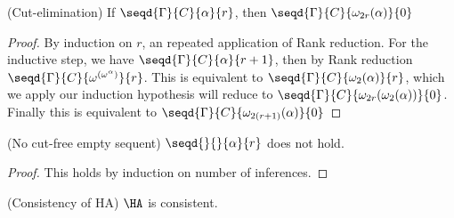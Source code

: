 \begin{cththeorem}{(Cut-elimination)}
    If $\seqd{\Gamma}{C}{\alpha}{r}$, then $\seqd{\Gamma}{C}{\omega_{2r}(\alpha)}{0}$
\end{cththeorem}
\begin{proof}
    By induction on $r$, an repeated application of Rank reduction. For the inductive step, we have $\seqd{\Gamma}{C}{\alpha}{r+1}$, then by Rank reduction $\seqd{\Gamma}{C}{\omega^{\left(\omega^\alpha\right)}}{r}$. This is equivalent to $\seqd{\Gamma}{C}{\omega_2(\alpha)}{r}$, which we apply our induction hypothesis will reduce to $\seqd{\Gamma}{C}{\omega_{2r}(\omega_2(\alpha))}{0}$. Finally this is equivalent to $\seqd{\Gamma}{C}{\omega_{2(r+1)}(\alpha)}{0}$
\end{proof}

\begin{cththeorem}{(No cut-free empty sequent)}
    $\seqd{}{}{\alpha}{r}$ does not hold.
\end{cththeorem}
\begin{proof}
    This holds by induction on number of inferences.
\end{proof}

\begin{cththeorem}{(Consistency of HA)}
    $\HA$ is consistent.
\end{cththeorem}


